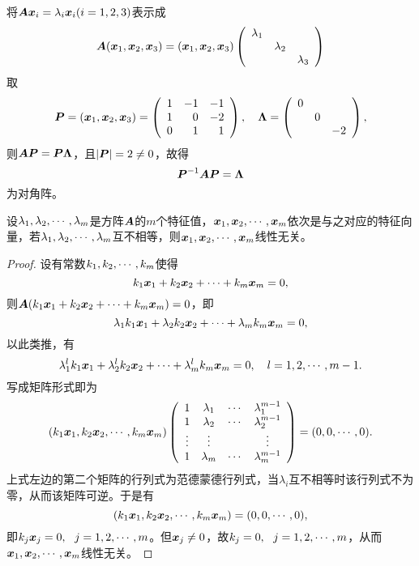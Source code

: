 \begin{frame}
\begin{jie}
将$\boldsymbol{A}{\boldsymbol{x}}_i=\lambda_i{\boldsymbol{x}}_i(i=1,2,3)$表示成
$$
\boldsymbol{A}({\boldsymbol{x}}_1,{\boldsymbol{x}}_2,{\boldsymbol{x}}_3)=({\boldsymbol{x}}_1,{\boldsymbol{x}}_2,{\boldsymbol{x}}_3)\left(
  \begin{array}{ccc}
    \lambda_1&&\\
    &\lambda_2\\
    &&\lambda_3\\
  \end{array}
\right)
$$
取
$$
\boldsymbol{P}=({\boldsymbol{x}}_1,{\boldsymbol{x}}_2,{\boldsymbol{x}}_3)=\left(
  \begin{array}{rrr}
    1&-1&-1\\
    1& 0&-2\\
    0& 1& 1
  \end{array}
\right), \quad \boldsymbol{\Lambda}=\left(
  \begin{array}{rrr}
    0&&\\
     &0&\\
     & &-2
  \end{array}
\right),
$$
则$\boldsymbol{A}\boldsymbol{P}=\boldsymbol{P}\boldsymbol{\Lambda}$，且$|\boldsymbol{P}|=2\ne 0$，故得
$$
\boldsymbol{P}^{-1}\boldsymbol{A}\boldsymbol{P}=\boldsymbol{\Lambda}
$$
为对角阵。
\end{jie}
\end{frame}

\begin{frame}[fragile]\ft{\subsecname}  

\begin{dingli}
  设$\lambda_1,\lambda_2,\cdots,\lambda_m$是方阵$\boldsymbol{A}$的$m$个特征值，${\boldsymbol{x}}_1,{\boldsymbol{x}}_2,\cdots,{\boldsymbol{x}}_m$依次是与之对应的特征向量，若$\lambda_1,\lambda_2,\cdots,\lambda_m$互不相等，则${\boldsymbol{x}}_1,{\boldsymbol{x}}_2,\cdots,{\boldsymbol{x}}_m$线性无关。
\end{dingli}
\end{frame}

\begin{frame}\ft{\subsecname}  
\begin{proof}
  设有常数$k_1,k_2,\cdots,k_m$使得
  $$
  k_1{\boldsymbol{x}}_1+k_2{\boldsymbol{x}}_2+\cdots+k_m{\boldsymbol{x}}_m=0,
  $$
  则$\boldsymbol{A}(k_1{\boldsymbol{x}}_1+k_2{\boldsymbol{x}}_2+\cdots+k_m{\boldsymbol{x}}_m)=0$，即
  $$
  \lambda_1k_1{\boldsymbol{x}}_1+\lambda_2k_2{\boldsymbol{x}}_2+\cdots+\lambda_mk_m{\boldsymbol{x}}_m=0,
  $$
  以此类推，有
  $$
  \lambda_1^lk_1{\boldsymbol{x}}_1+\lambda_2^lk_2{\boldsymbol{x}}_2+\cdots+\lambda_m^lk_m{\boldsymbol{x}}_m=0, \quad l=1,2,\cdots,m-1.
  $$
  写成矩阵形式即为
  $$
  (k_1{\boldsymbol{x}}_1,k_2{\boldsymbol{x}}_2,\cdots,k_m{\boldsymbol{x}}_m)\left(
    \begin{array}{cccc}
      1&\lambda_1&\cdots&\lambda_1^{m-1}\\
      1&\lambda_2&\cdots&\lambda_2^{m-1}\\
      \vdots&\vdots&&\vdots\\
      1&\lambda_m&\cdots&\lambda_m^{m-1}\\
    \end{array}
  \right)=(0,0,\cdots,0).
  $$
  上式左边的第二个矩阵的行列式为范德蒙德行列式，当$\lambda_i$互不相等时该行列式不为零，从而该矩阵可逆。于是有
  $$
  (k_1{\boldsymbol{x}}_1,k_2{\boldsymbol{x}}_2,\cdots,k_m{\boldsymbol{x}}_m)=(0,0,\cdots,0),
  $$
  即$k_j{\boldsymbol{x}}_j=0, ~~j=1,2,\cdots,m$。但${\boldsymbol{x}}_j\ne 0$，故$k_j=0,~~j=1,2,\cdots,m$，从而${\boldsymbol{x}}_1,{\boldsymbol{x}}_2,\cdots,{\boldsymbol{x}}_m$线性无关。
\end{proof}
\end{frame}

